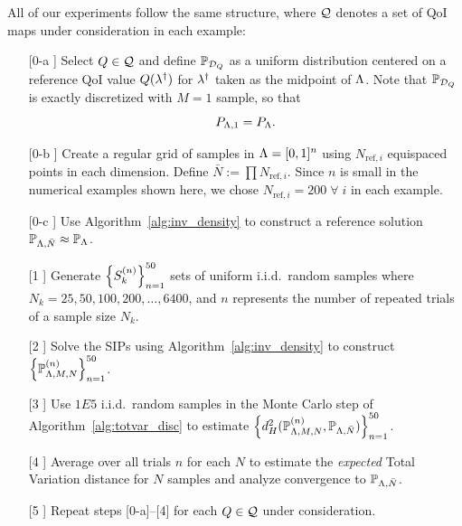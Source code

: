 All of our experiments follow the same structure, where $\mathcal{Q}$ denotes a set of QoI maps under consideration in each example:
\begin{itemize}
\item[[0-a]] Select $Q\in\mathcal{Q}$ and define $\mathbb{P}_{\mathcal{D}_Q}$ as a uniform distribution centered on a reference QoI value $Q(\lambda^\dagger)$ for $\lambda^\dagger$ taken as the midpoint of ${\Lambda}$.
Note that $\mathbb{P}_{\mathcal{D}_Q}$ is exactly discretized with $M=1$ sample, so that
\[
P_{{\Lambda}, 1} = P_{\Lambda}.
\]
\item[[0-b]] Create a regular grid of samples in ${\Lambda}=[0,1]^n$ using $N_{\text{ref},i}$ equispaced points in each dimension.
Define $\bar{N} := \prod N_{\text{ref},i}$.
Since $n$ is small in the numerical examples shown here, we chose $N_{\text{ref},i} = 200 \; \forall \; i$ in each example.
\item[[0-c]] Use Algorithm~\ref{alg:inv_density} to construct a reference solution $\mathbb{P}_{{\Lambda},\bar{N}}\approx \mathbb{P}_{\Lambda}$.
\item[[1]] Generate $\left\{S_k^{(n)}\right\}_{n=1}^{50}$ sets of uniform i.i.d.~random samples where $N_k = 25, 50, 100, 200, \hdots, 6400$, and $n$ represents the number of repeated trials of a sample size $N_k$.
\item[[2]] Solve the SIPs using Algorithm~\ref{alg:inv_density} to construct $\left\{\mathbb{P}_{{\Lambda},M,N}^{(n)}\right\}_{n=1}^{50}$.
\item[[3]] Use $1E5$ i.i.d.~random samples in the Monte Carlo step of Algorithm~\ref{alg:totvar_disc} to estimate $\left\{d_H^2( \mathbb{P}_{{\Lambda},M,N}^{(n)}, \mathbb{P}_{{\Lambda},\bar{N}})\right\}_{n=1}^{50}$.
\item[[4]] Average over all trials $n$ for each $N$ to estimate the {\em expected} Total Variation distance for $N$ samples and analyze convergence to $\mathbb{P}_{{\Lambda},\bar{N}}$.
\item[[5]] Repeat steps [0-a]--[4] for each $Q\in\mathcal{Q}$ under consideration.
\end{itemize}

\FloatBarrier
